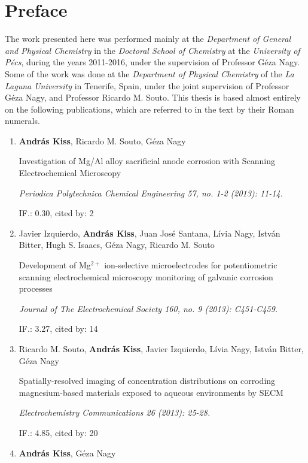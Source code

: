 \chapter*{Preface}
The work presented here was performed mainly at the \emph{Department of General and Physical Chemistry} in the \emph{Doctoral School of Chemistry} at the \emph{University of Pécs}, during the years 2011-2016, under the supervision of Professor Géza Nagy.
Some of the work was done at the \emph{Department of Physical Chemistry} of the \emph{La Laguna University} in Tenerife, Spain, under the joint supervision of Professor Géza Nagy, and Professor Ricardo M. Souto.
This thesis is based almost entirely on the following publications, which are referred to in the text by their Roman numerals.

\begin{enumerate}
\item \textbf{András Kiss}, Ricardo M. Souto, Géza Nagy

Investigation of Mg/Al alloy sacrificial anode corrosion with Scanning Electrochemical Microscopy

\emph{Periodica Polytechnica Chemical Engineering 57, no. 1-2 (2013): 11-14.}

IF.: 0.30, cited by: 2

\item Javier Izquierdo, \textbf{András Kiss}, Juan José Santana, Lívia Nagy, István Bitter, Hugh S. Isaacs, Géza Nagy, Ricardo M. Souto

Development of Mg$^{2+}$ ion-selective microelectrodes for potentiometric scanning electrochemical microscopy monitoring of galvanic corrosion processes

\emph{Journal of The Electrochemical Society 160, no. 9 (2013): C451-C459.}

IF.: 3.27, cited by: 14

\item Ricardo M. Souto, \textbf{András Kiss}, Javier Izquierdo, Lívia Nagy, István Bitter, Géza Nagy

Spatially-resolved imaging of concentration distributions on corroding mag\-ne\-si\-um-based materials exposed to aqueous environments by SECM

\emph{Electrochemistry Communications 26 (2013): 25-28.}

IF.: 4.85, cited by: 20

\item \textbf{András Kiss}, Géza Nagy


\end{enumerate}
